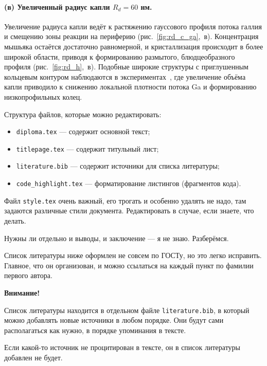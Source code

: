 \documentclass[14pt,oneside]{extarticle}
\begin{document}
\paragraph{(в) Увеличенный радиус капли \(R_d = 60\) нм.}
Увеличение радиуса капли ведёт к растяжению гауссового профиля потока галлия и смещению зоны реакции на периферию (рис.~\ref{fig:rd_c_ga},~в). Концентрация мышьяка остаётся достаточно равномерной, и кристаллизация происходит в более широкой области, приводя к формированию размытого, блюдцеобразного профиля (рис.~\ref{fig:rd_h},~в). Подобные широкие структуры с приглушенным кольцевым контуром наблюдаются в экспериментах~\cite{wang2021droplet}, где увеличение объёма капли приводило к снижению локальной плотности потока Ga и формированию низкопрофильных колец.

\pagebreak
{}
Структура файлов, которые можно редактировать:

\begin{itemize}
    \item \verb|diploma.tex| --- содержит основной текст;
    \item \verb|titlepage.tex| --- содержит титульный лист;
    \item \verb|literature.bib| --- содержит источники для списка литературы;
    \item \verb|code_highlight.tex| --- форматирование листингов (фрагментов кода).
\end{itemize}

Файл \verb|style.tex| очень важный, его трогать и особенно удалять не надо, там задаются различные стили документа. Редактировать в случае, если знаете, что делать.


Нужны ли отдельно и выводы, и заключение --- я не знаю. Разберёмся.

Список литературы ниже оформлен не совсем по ГОСТу, но это легко исправить. Главное, что он организован, и можно ссылаться на каждый пункт по фамилии первого автора.

\textbf{Внимание!} 

Список литературы находится в отдельном файле \verb|literature.bib|, в который можно добавлять новые источники в любом порядке. Они будут сами располагаться как нужно, в порядке упоминания в тексте.

Если какой-то источник не процитирован в тексте, он в список литературы добавлен не будет.
\end{document}

